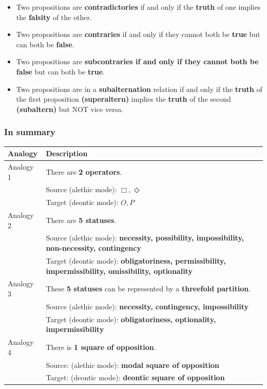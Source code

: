 \documentclass[11pt]{article}
\begin{document}
\begin{itemize}
\item Two propositions are \textbf{contradictories} if and only if the \textbf{truth} of one implies the \textbf{falsity} of the other.
\item Two propositions are \textbf{contraries} if and only if they cannot both be \textbf{true} but can both be \textbf{false}.
\item Two propositions are \textbf{subcontraries if and only if they cannot both be false} but can both be \textbf{true}.
\item Two propositions are in a \textbf{subalternation} relation if and only if the \textbf{truth} of the first proposition \textbf{(superaltern)} implies the \textbf{truth} of the second \textbf{(subaltern)} but NOT vice versa.
\end{itemize}
\subsubsection{In summary}
\label{sec:org9f806c2}
\begin{center}
\begin{tabular}{|m{5em}|m{25em}|}
\hline
Analogy & Description\\
\hline
Analogy 1 & There are \textbf{2 operators}.\\
 & Source (alethic mode): \(\Box, \Diamond\)\\
 & Target (deontic mode): \(O, P\)\\
\hline
Analogy 2 & There are \textbf{5 statuses}.\\
 & Source (alethic mode): \textbf{necessity, possibility, impossibility, non-necessity, contingency}\\
 & Target (deontic mode): \textbf{obligatoriness, permissibility, impermissibility, omissibility, optionality}\\
\hline
Analogy 3 & These \textbf{5 statuses} can be represented by a \textbf{threefold partition}.\\
 & Source (alethic mode): \textbf{necessity, contingency, impossibility}\\
 & Target (deontic mode): \textbf{obligatoriness, optionality, impermissibility}\\
\hline
Analogy 4 & There is \textbf{1 square of opposition}.\\
 & Source: (alethic mode): \textbf{modal square of opposition}\\
 & Target: (deontic mode): \textbf{deontic square of opposition}\\
\hline
\end{tabular}
\end{center}
\end{document}
